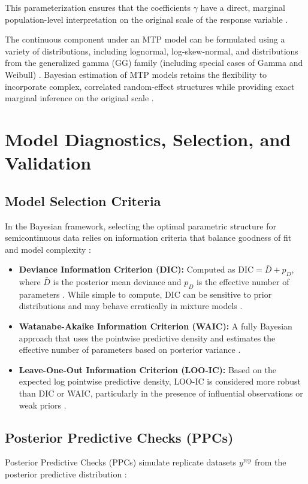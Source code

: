 \documentclass[11pt, a4paper]{article}
\begin{document}
This parameterization ensures that the coefficients $\gamma$ have a direct, marginal population-level interpretation on the original scale of the response variable \cite{ref3, ref46}.

The continuous component under an MTP model can be formulated using a variety of distributions, including lognormal, log-skew-normal, and distributions from the generalized gamma (GG) family (including special cases of Gamma and Weibull) \cite{ref3}. Bayesian estimation of MTP models retains the flexibility to incorporate complex, correlated random-effect structures while providing exact marginal inference on the original scale \cite{ref3, ref46}.

\section{Model Diagnostics, Selection, and Validation}

\subsection{Model Selection Criteria}
In the Bayesian framework, selecting the optimal parametric structure for semicontinuous data relies on information criteria that balance goodness of fit and model complexity \cite{ref4, ref7}:
\begin{itemize}
    \item \textbf{Deviance Information Criterion (DIC):} Computed as $\text{DIC} = \bar{D} + p_D$, where $\bar{D}$ is the posterior mean deviance and $p_D$ is the effective number of parameters \cite{ref30, ref40}. While simple to compute, DIC can be sensitive to prior distributions and may behave erratically in mixture models \cite{ref4}.
    \item \textbf{Watanabe-Akaike Information Criterion (WAIC):} A fully Bayesian approach that uses the pointwise predictive density and estimates the effective number of parameters based on posterior variance \cite{ref4, ref7}.
    \item \textbf{Leave-One-Out Information Criterion (LOO-IC):} Based on the expected log pointwise predictive density, LOO-IC is considered more robust than DIC or WAIC, particularly in the presence of influential observations or weak priors \cite{ref4}.
\end{itemize}

\subsection{Posterior Predictive Checks (PPCs)}
Posterior Predictive Checks (PPCs) simulate replicate datasets $y^{\text{rep}}$ from the posterior predictive distribution \cite{ref22, ref47}:
\end{document}
